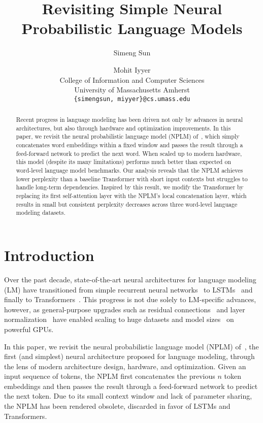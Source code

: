 \documentclass[11pt]{article}
\title{Revisiting Simple Neural Probabilistic Language Models}
\author{Simeng Sun \and Mohit Iyyer \\
        College of Information and Computer Sciences\\ University of Massachusetts Amherst \\
        \texttt{\{simengsun, miyyer\}@cs.umass.edu}}
\begin{document}
\maketitle

\newcommand\wtthree{\textsc{Wikitext-103}}
\newcommand\wttwo{\textsc{Wikitext-2}}
\newcommand\lambada{\textsc{lambada}}
\newcommand\enwik{\textsc{enwik8}}
\newcommand{\bmat}[1]{\text{\textbf{#1}}}
\newcommand{\bvec}[1]{\boldsymbol{#1}}

\begin{abstract}
Recent progress in language modeling has been driven not only by advances in neural architectures, but also through hardware and optimization improvements. In this paper, we revisit the neural probabilistic language model (NPLM) of~\citet{Bengio2003ANP}, which simply concatenates word embeddings within a fixed window and passes the result through a feed-forward network to predict the next word. When scaled up to modern hardware, this model (despite its many limitations) performs much better than expected on word-level language model benchmarks. Our analysis reveals that the NPLM achieves lower perplexity than a baseline Transformer with short input contexts but struggles to handle long-term dependencies. Inspired by this result, we modify the Transformer by replacing its first self-attention layer with the NPLM's local concatenation layer, which results in small but consistent perplexity decreases across three word-level language modeling datasets.  
\end{abstract}


 \section{Introduction}



Over the past decade, state-of-the-art neural architectures for language modeling (LM) have transitioned from simple recurrent neural networks~\citep{mikolov2011extensions} to LSTMs~\citep{zaremba2014recurrent} and finally to Transformers~\citep{NIPS2017_3f5ee243}. This progress is not due solely to LM-specific advances, however, as general-purpose upgrades such as residual connections~\citep{he2016deep} and layer normalization~\citep{ba2016layer} have enabled scaling to huge datasets and model sizes~\citep{kaplan2020scaling} on powerful GPUs.

In this paper, we revisit the neural probabilistic language model (NPLM) of~\citet{Bengio2003ANP}, the first (and simplest) neural architecture proposed for language modeling, through the lens of modern architecture design, hardware, and optimization. Given an input sequence of tokens, the NPLM first concatenates the previous $n$ token embeddings and then passes the result through a feed-forward network to predict the next token. Due to its small context window and lack of parameter sharing, the NPLM has been rendered obsolete, discarded in favor of LSTMs and Transformers.
\end{document}
